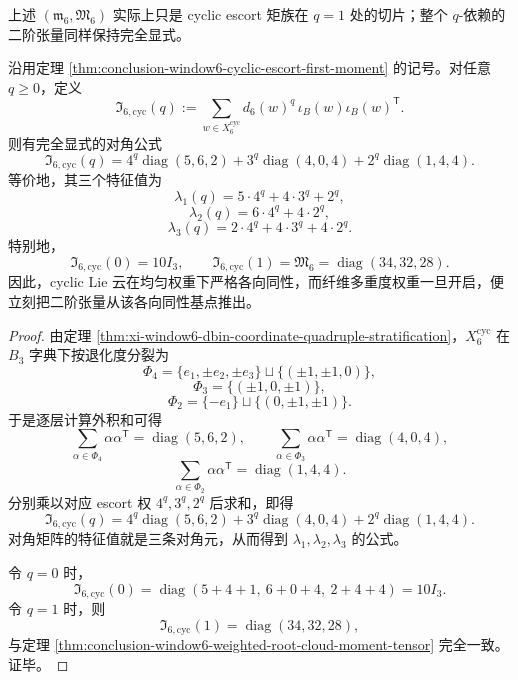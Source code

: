 \noindent
上述 \((\mathfrak m_6,\mathfrak M_6)\) 实际上只是 cyclic escort 矩族在 \(q=1\) 处的切片；整个 \(q\)-依赖的二阶张量同样保持完全显式。

\begin{theorem}\label{thm:conclusion-window6-cyclic-escort-second-moment-tensor}
沿用定理 \ref{thm:conclusion-window6-cyclic-escort-first-moment} 的记号。对任意 \(q\ge 0\)，定义
\[
\mathfrak I_{6,\mathrm{cyc}}(q)
:=
\sum_{w\in X_6^{\mathrm{cyc}}} d_6(w)^q\,\iota_B(w)\iota_B(w)^{\mathsf T}.
\]
则有完全显式的对角公式
\[
\mathfrak I_{6,\mathrm{cyc}}(q)
=
4^q\operatorname{diag}(5,6,2)
+3^q\operatorname{diag}(4,0,4)
+2^q\operatorname{diag}(1,4,4).
\]
等价地，其三个特征值为
\[
\lambda_1(q)=5\cdot 4^q+4\cdot 3^q+2^q,
\]
\[
\lambda_2(q)=6\cdot 4^q+4\cdot 2^q,
\]
\[
\lambda_3(q)=2\cdot 4^q+4\cdot 3^q+4\cdot 2^q.
\]
特别地，
\[
\mathfrak I_{6,\mathrm{cyc}}(0)=10I_3,
\qquad
\mathfrak I_{6,\mathrm{cyc}}(1)=\mathfrak M_6=\operatorname{diag}(34,32,28).
\]
因此，cyclic Lie 云在均匀权重下严格各向同性，而纤维多重度权重一旦开启，便立刻把二阶张量从该各向同性基点推出。
\end{theorem}
\begin{proof}
由定理 \ref{thm:xi-window6-dbin-coordinate-quadruple-stratification}，\(X_6^{\mathrm{cyc}}\) 在 \(B_3\) 字典下按退化度分裂为
\[
\Phi_4=\{e_1,\pm e_2,\pm e_3\}\sqcup\{(\pm1,\pm1,0)\},
\]
\[
\Phi_3=\{(\pm1,0,\pm1)\},
\]
\[
\Phi_2=\{-e_1\}\sqcup\{(0,\pm1,\pm1)\}.
\]
于是逐层计算外积和可得
\[
\sum_{\alpha\in\Phi_4}\alpha\alpha^{\mathsf T}=\operatorname{diag}(5,6,2),
\qquad
\sum_{\alpha\in\Phi_3}\alpha\alpha^{\mathsf T}=\operatorname{diag}(4,0,4),
\]
\[
\sum_{\alpha\in\Phi_2}\alpha\alpha^{\mathsf T}=\operatorname{diag}(1,4,4).
\]
分别乘以对应 escort 权 \(4^q,3^q,2^q\) 后求和，即得
\[
\mathfrak I_{6,\mathrm{cyc}}(q)
=
4^q\operatorname{diag}(5,6,2)
+3^q\operatorname{diag}(4,0,4)
+2^q\operatorname{diag}(1,4,4).
\]
对角矩阵的特征值就是三条对角元，从而得到 \(\lambda_1,\lambda_2,\lambda_3\) 的公式。

令 \(q=0\) 时，
\[
\mathfrak I_{6,\mathrm{cyc}}(0)
=
\operatorname{diag}(5+4+1,\ 6+0+4,\ 2+4+4)
=10I_3.
\]
令 \(q=1\) 时，则
\[
\mathfrak I_{6,\mathrm{cyc}}(1)
=
\operatorname{diag}(34,32,28),
\]
与定理 \ref{thm:conclusion-window6-weighted-root-cloud-moment-tensor} 完全一致。证毕。
\end{proof}

